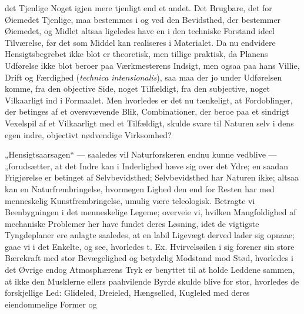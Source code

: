 \documentclass[12pt,a4paper]{book}
\begin{document}
det Tjenlige Noget igjen mere tjenligt end et andet. Det Brugbare, det for
Øiemedet Tjenlige, maa bestemmes i og ved den Bevidsthed, der bestemmer
Øiemedet, og Midlet altsaa ligeledes have en i den techniske Forstand
ideel Tilværelse, før det som Middel kan realiseres i Materialet. Da nu
endvidere Hensigtsbegrebet ikke blot er theoretisk, men tillige praktisk,
da Planens Udførelse ikke blot beroer paa Værkmesterens Indsigt, men ogsaa
paa hans Villie, Drift og Færdighed (\textit{technica intensionalis}), saa
maa der jo under Udførelsen komme, fra den objective Side, noget
Tilfældigt, fra den subjective, noget Vilkaarligt ind i Formaalet. Men
hvorledes er det nu tænkeligt, at Fordoblinger, der betinges af et
oversvævende Blik, Combinationer, der beroe paa et sindrigt Vexelspil af
et Vilkaarligt med et Tilfældigt, skulde svare til Naturen selv i dens
egen indre, objectivt nødvendige Virksomhed?

„Hensigtsaarsagen“ --- saaledes vil Naturforskeren endnu kunne vedblive
--- „forudsætter, at det Indre kan i Inderlighed hæve sig over det Ydre;
en saadan Frigjørelse er betinget af Selvbevidsthed; Selvbevidsthed har
Naturen ikke; altsaa kan en Naturfrembringelse, hvormegen Lighed den end
for Resten har med menneskelig Kunstfrembringelse, umulig være
teleologisk. Betragte vi Beenbygningen i det menneskelige Legeme; overveie
vi, hvilken Mangfoldighed af mechaniske Problemer her have fundet deres
Løsning, idet de vigtigste Tyngdeplaner ere anlagte saaledes, at en labil
Ligevægt derved lader sig opnaae; gaae vi i det Enkelte, og see, hvorledes
t. Ex. Hvirvelsøilen i sig forener sin store Bærekraft med stor
Bevægelighed og betydelig Modstand mod Stød, hvorledes i det Øvrige endog
Atmosphærens Tryk er benyttet til at holde Leddene sammen, at ikke den
Musklerne ellers paahvilende Byrde skulde blive for stor, hvorledes de
forskjellige Led: Glideled, Dreieled, Hængselled, Kugleled med deres
eiendommelige Former og
\end{document}
